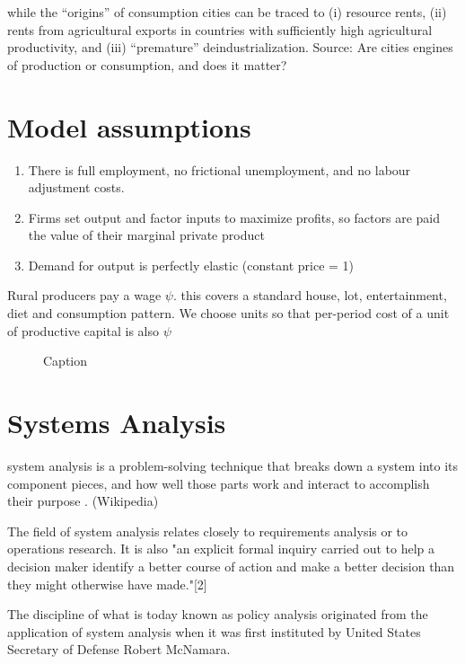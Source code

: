 while the ``origins'' of consumption cities can be traced to (i)
resource rents, (ii) rents from agricultural exports in countries with sufficiently high agricultural productivity, and (iii) ``premature'' deindustrialization.  Source:
{Are cities engines of production or consumption, and does it matter?}


\section{Model assumptions}
\begin{enumerate}
\item There is full employment, no frictional unemployment, and no labour adjustment costs.
\item Firms set output and factor inputs to maximize profits, so factors are paid the value of their marginal private product
\item Demand for output is perfectly elastic (constant price = 1)
\end{enumerate}


Rural producers pay a wage $\psi$. this covers a standard house, lot, entertainment, diet and consumption pattern. We  choose units so that per-period cost of a unit of productive capital is also $\psi$

\begin{figure}
\centering

\caption{Caption}
\label{fig-community-forestry}
\end{figure}


\section{Systems Analysis}
 
 system analysis is a problem-solving technique that breaks down a system into its component pieces, and how well those parts work and interact to accomplish their purpose . (Wikipedia)

The field of system analysis relates closely to requirements analysis or to operations research. It is also "an explicit formal inquiry carried out to help a decision maker identify a better course of action and make a better decision than they might otherwise have made."[2] 

The discipline of what is today known as policy analysis originated from the application of system analysis when it was first instituted by United States Secretary of Defense Robert McNamara.

